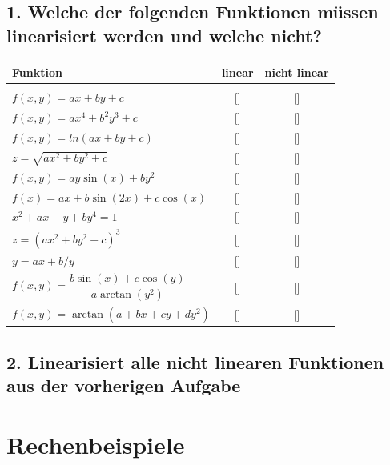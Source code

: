 \documentclass[11pt,final]{scrreprt}
\newcommand{\br} {\medskip\\}
\begin{document}
\subsection*{1. Welche der folgenden Funktionen müssen linearisiert werden und welche nicht?}
\begin{tabular}{l|cc}
Funktion & linear & nicht linear \\ 
\hline\\
$f(x, y) = ax + by + c$ & [\hspace*{1em}] & [\hspace*{1em}] \br
$f(x, y) = ax^4 + b^2y^3 + c$ & [\hspace*{1em}] & [\hspace*{1em}] \br
$f(x, y) = ln(ax+by + c)$ & [\hspace*{1em}] & [\hspace*{1em}] \br
$z = \sqrt{ax^2 +by^2+c}$ & [\hspace*{1em}] & [\hspace*{1em}] \br 
$f(x, y) = ay\sin(x) + by^2$ & [\hspace*{1em}] & [\hspace*{1em}] \br
$f(x) = ax+b\sin(2x)+c\cos(x)$ & [\hspace*{1em}] & [\hspace*{1em}] \br
$x^2+ax-y+by^4 = 1$ & [\hspace*{1em}] & [\hspace*{1em}] \br
$z = \left( ax^2+by^2+c\right)^3$ & [\hspace*{1em}] & [\hspace*{1em}] \br
$y = ax + b/y$ & [\hspace*{1em}] & [\hspace*{1em}] \br 
$f(x, y) = \dfrac{b\sin(x)+c\cos(y)}{a\arctan(y^2)}$ & [\hspace*{1em}] & [\hspace*{1em}] \br 
$f(x, y) = \arctan(a+bx+cy+dy^2)$ & [\hspace*{1em}] & [\hspace*{1em}] \\ 
\end{tabular} 

\subsection*{2. Linearisiert alle nicht linearen Funktionen aus der vorherigen Aufgabe}

\newpage
\section{Rechenbeispiele}
\end{document}
